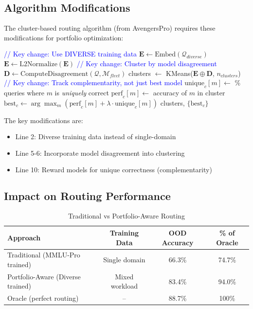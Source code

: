 \documentclass[11pt,a4paper]{article}
\begin{document}
\subsection{Algorithm Modifications}

The cluster-based routing algorithm (from AvengersPro) requires these modifications for portfolio optimization:

\begin{algorithm}[H]
\caption{Portfolio-Aware Cluster Routing}
\begin{algorithmic}[1]
    \State \textcolor{blue}{// Key change: Use DIVERSE training data}
    \State $\mathbf{E} \gets \text{Embed}(\mathcal{Q}_{diverse})$
    \State $\mathbf{E} \gets \text{L2Normalize}(\mathbf{E})$
    \State \textcolor{blue}{// Key change: Cluster by model disagreement}
    \State $\mathbf{D} \gets \text{ComputeDisagreement}(\mathcal{Q}, \mathcal{M}_{fleet})$
    \State clusters $\gets$ KMeans($\mathbf{E} \oplus \mathbf{D}$, $n_{clusters}$)
        \State \textcolor{blue}{// Key change: Track complementarity, not just best model}
            \State $\text{unique}_c[m] \gets$ \% queries where $m$ is \emph{uniquely} correct
            \State $\text{perf}_c[m] \gets$ accuracy of $m$ in cluster
        \EndFor
        \State $\text{best}_c \gets \arg\max_m (\text{perf}_c[m] + \lambda \cdot \text{unique}_c[m])$
    \EndFor
    \State \Return clusters, $\{\text{best}_c\}$
\EndProcedure
\end{algorithmic}
\end{algorithm}

The key modifications are:
\begin{itemize}
    \item Line 2: Diverse training data instead of single-domain
    \item Line 5-6: Incorporate model disagreement into clustering
    \item Line 10: Reward models for unique correctness (complementarity)
\end{itemize}

\subsection{Impact on Routing Performance}

\begin{table}[h]
\centering
\caption{Traditional vs Portfolio-Aware Routing}
\label{tab:routing_comparison}
\begin{tabular}{lccc}
\toprule
\textbf{Approach} & \textbf{Training Data} & \textbf{OOD Accuracy} & \textbf{\% of Oracle} \\
\midrule
Traditional (MMLU-Pro trained) & Single domain & 66.3\% & 74.7\% \\
Portfolio-Aware (Diverse trained) & Mixed workload & 83.4\% & 94.0\% \\
Oracle (perfect routing) & -- & 88.7\% & 100\% \\
\bottomrule
\end{tabular}
\end{table}
\end{document}
